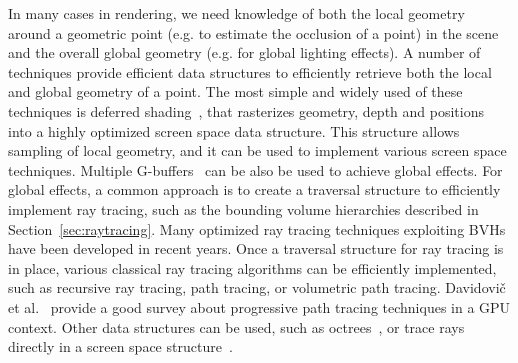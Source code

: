 In many cases in rendering, we need knowledge of both the local geometry around a geometric point (e.g. to estimate the occlusion of a point) in the scene and the overall global geometry (e.g. for global lighting effects). A number of techniques provide efficient data structures to efficiently retrieve both the local and global geometry of a point. The most simple and widely used of these techniques is deferred shading~\cite{Saito1990}, that rasterizes geometry, depth and positions into a highly optimized screen space data structure. This structure allows sampling of local geometry, and it can be used to implement various screen space techniques. Multiple G-buffers~\cite{Mara2016} can be also be used to achieve global effects. For global effects, a common approach is to create a traversal structure to efficiently implement ray tracing, such as the bounding volume hierarchies described in Section~\ref{sec:raytracing}. Many optimized ray tracing techniques exploiting BVHs have been developed in recent years. Once a traversal structure for ray tracing is in place, various classical ray tracing algorithms can be efficiently implemented, such as recursive ray tracing, path tracing, or volumetric path tracing. Davidovi\v{c} et al.~\cite{Davidovic2014} provide a good survey about progressive path tracing techniques in a GPU context. Other data structures can be used, such as octrees~\cite{Havran2000}, or trace rays directly in a screen space structure~\cite{Tanaka1986,McGuire2014, Widmer2015}. 

